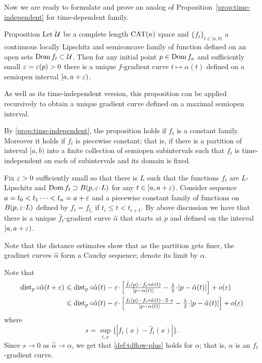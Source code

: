 \documentclass[oneside,a4paper, 12pt]{article}
\begin{document}
Now we are ready to formulate and prove an analog of Proposition~\ref{prop:time-independent} for time-dependent family.

\begin{thm}{Proposition}\label{prop:time-dependent}
Let $\mathcal{U}$ be a complete length $\mathrm{CAT}(\kappa)$ space and
$\{f_t\}_{t\in[a,b)}$ a continuous locally Lipschitz and semiconcave family of function defined on an open sets $\mathop{\rm Dom}\nolimits f_t\subset {\mathcal{U}}$.
Then for any initial point $p\in \mathop{\rm Dom}\nolimits f_a$ and sufficiently small $\varepsilon=\varepsilon(p)>0$ there is a unique $f$-gradient curve $t\mapsto\alpha(t)$ defined on a semiopen interval $[a,a+\varepsilon)$. 
\end{thm}

As well as its time-independent version, this proposition can be applied recursively to obtain a unique gradient curve defined on a maximal semiopen interval.

By \ref{prop:time-independent}, the proposition holds if $f_t$ is a constant family.
Moreover it holds if $f_t$ is piecewise constant;
that is, if there is a partition of interval $[a,b)$ into a finite collection of semiopen subintervals such that $f_t$ is time-independent on each of subintervals and its domain is fixed.

Fix $\varepsilon>0$ sufficiently small so that there is $L$ such that the functions $f_t$ are $L$-Lipschitz and $\Dom f_t\supset B(p,\eps\cdot L)$ for any $t\in[a,a+\varepsilon)$.
Consider sequence  $a=t_0<t_1\dots<t_n\z=a+\eps$ and a piecewise constant family of functions on $B(p,\eps\cdot L)$ defined by $\hat f_t=f_{t_i}$ if $t_i\le t<t_{i+1}$.
By above discussion we have that there is a unique $\hat f_t$-gradient curve $\hat \alpha$ that starts at $p$ and defined on the interval $[a,a+\varepsilon)$.

Note that the distance estimates show that as the partition gets finer, the gradinet curves $\hat\alpha$ form a Cauchy sequence; denote its limit by $\alpha$.

Note that 
\begin{align*}
\dist_p\circ\hat\alpha(t+\eps)
&\le 
\dist_p\circ\hat\alpha(t)
-\eps\cdot \left[\tfrac{\hat f_t(p)-\hat f_t\circ\hat\alpha(t)}{|p-\alpha(t)|}-\tfrac\lambda2\cdot |p-\hat\alpha(t)|\right]
+o(\eps)
\\
&\le 
\dist_p\circ\hat\alpha(t)
-\eps\cdot \left[\tfrac{f_t(p)-f_t\circ\hat\alpha(t)-2\cdot s}{|p-\alpha(t)|}-\tfrac\lambda2\cdot |p-\hat\alpha(t)|\right]
+o(\eps)
\end{align*}
where 
\[s=\sup_{t,x} \{|f_t(x)-\hat f_t(x)|\}.\]
Since $s\to 0$ as $\hat\alpha\to \alpha$, we get that \ref{def:tdflow-plus} holds for $\alpha$;
that is, $\alpha$ is an $f_t$-gradient curve.
\qeds



{\small\sloppy

\printbibliography[heading=bibintoc]

}
\end{document}
